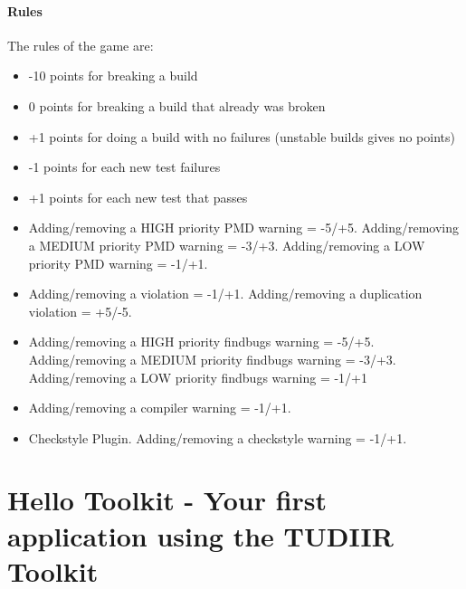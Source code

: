 \documentclass[a4paper,twoside]{book}      %
\begin{document}
\paragraph{Rules}
The rules of the game are:
\begin{itemize}
\item -10 points for breaking a build
\item 0 points for breaking a build that already was broken
\item +1 points for doing a build with no failures (unstable builds gives no points)
\item -1 points for each new test failures
\item +1 points for each new test that passes
\item Adding/removing a HIGH priority PMD warning = -5/+5. Adding/removing a MEDIUM priority PMD warning = -3/+3. Adding/removing a LOW priority PMD warning = -1/+1.
\item Adding/removing a violation = -1/+1. Adding/removing a duplication violation = +5/-5.
\item Adding/removing a HIGH priority findbugs warning = -5/+5. Adding/removing a MEDIUM priority findbugs warning = -3/+3. Adding/removing a LOW priority findbugs warning = -1/+1
\item Adding/removing a compiler warning = -1/+1.
\item Checkstyle Plugin. Adding/removing a checkstyle warning = -1/+1.
\end{itemize}

\section{Hello Toolkit - Your first application using the TUDIIR Toolkit}
\end{document}
